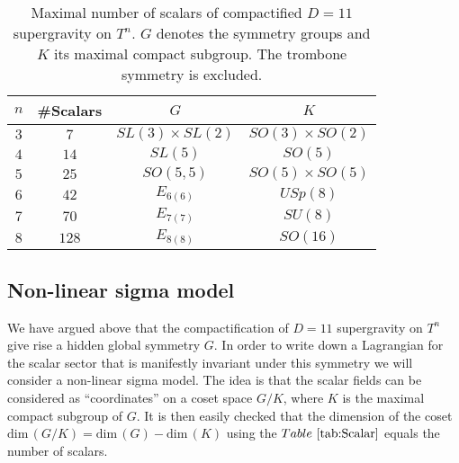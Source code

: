 \begin{table}[]
    \centering
    \caption{Maximal number of scalars of compactified $D=11$ supergravity on $T^n$. $G$ denotes the symmetry groups and $K$ its maximal compact subgroup. The trombone symmetry is excluded.}
    \label{tab:Scalar}
    \begin{tabular}{|c|c|c|c|}\hline
         $n$ & \#Scalars & $G$ & $K$ \\\hline
         $3$ & $7$ & $SL(3)\times SL(2)$ & $SO(3)\times SO(2)$\\\hline
         $4$ & $14$ & $SL(5)$ & $SO(5)$ \\\hline
         $5$ & $25$ & $SO(5,5)$ & $SO(5)\times SO(5)$ \\\hline
         $6$ & $42$ & $E_{6(6)}$ & $USp(8)$ \\\hline
         $7$ & $70$ & $E_{7(7)}$ & $SU(8)$ \\\hline
         $8$ & $128$ & $E_{8(8)}$ & $SO(16)$ \\\hline
    \end{tabular}
\end{table}

\subsection{Non-linear sigma model\label{sec:NonLinearSigmaModels}}
We have argued above that the compactification of $D=11$ supergravity on $T^n$ give rise a hidden global symmetry $G$. In order to write down a Lagrangian for the scalar sector that is manifestly invariant under this symmetry we will consider a non-linear sigma model. The idea is that the scalar fields can be considered as ``coordinates'' on a coset space $G/K$, where $K$ is the maximal compact subgroup of $G$. It is then easily checked that the dimension of the coset $\text{dim}\,(G/K)=\text{dim}\,(G)-\text{dim}\,(K)$ using the $\tabref{tab:Scalar}$ equals the number of scalars. 

